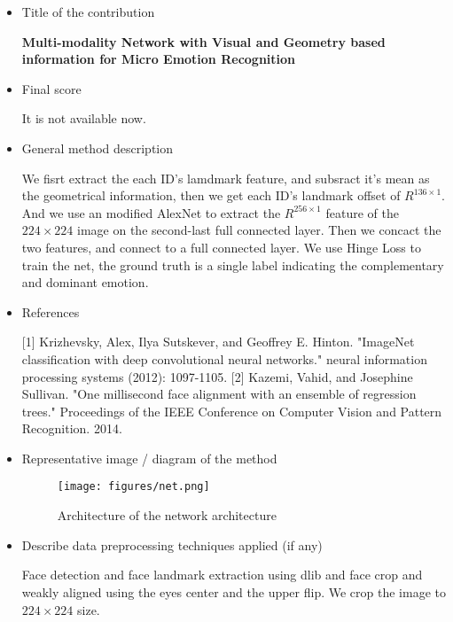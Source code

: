\documentclass{article}
\begin{document}
\begin{itemize}
\item Title of the contribution

\textbf{Multi-modality Network with Visual and Geometry based information for Micro Emotion Recognition}

\item Final score

It is not available now.

\item General method description

We fisrt extract the each ID's lamdmark feature, and subsract it's mean as the geometrical information, then we get each ID's landmark offset of $R^{136\times1}$. And we use an modified AlexNet to extract the $R^{256\times1}$ feature of the $224\times224$ image on the second-last full connected layer. Then we concact the two features, and connect to a full connected layer. We use Hinge Loss to train the net, the ground truth is a single label indicating the complementary and dominant emotion.

\item References

[1] Krizhevsky, Alex, Ilya Sutskever, and Geoffrey E. Hinton. "ImageNet classification with deep convolutional neural networks." neural information processing systems (2012): 1097-1105.
[2] Kazemi, Vahid, and Josephine Sullivan. "One millisecond face alignment with an ensemble of regression trees." Proceedings of the IEEE Conference on Computer Vision and Pattern Recognition. 2014.

\item Representative image / diagram of the method

\begin{figure}
\centering
\texttt{[image: figures/net.png]}
\caption{Architecture of the network architecture}
\label{fig:architecture}
\end{figure}


\item Describe data preprocessing techniques applied (if any)

Face detection and face landmark extraction using dlib and face crop and weakly aligned using the eyes center and the upper flip. We crop the image to $224 \times 224$ size.

\end{itemize}
\end{document}
